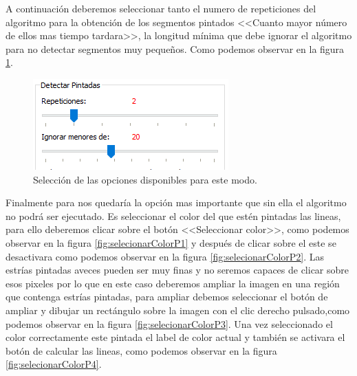 \documentclass[13pt]{book}              %
\begin{document}
{A continuación deberemos seleccionar tanto el numero de repeticiones del algoritmo para la obtención de los segmentos pintados <<Cuanto mayor número de ellos mas tiempo tardara>>, la longitud mínima que debe ignorar el algoritmo para no detectar segmentos muy pequeños. Como podemos observar en la figura \ref{fig:opcionesAlg}.

\begin{figure}[h]
\centering
\includegraphics[width=.55\textwidth]{opcionesAlg}
\caption{Selección de las opciones disponibles para este modo.}
\label{fig:opcionesAlg}
\end{figure}

Finalmente para nos quedaría la opción mas importante que sin ella el algoritmo no podrá ser ejecutado. Es seleccionar el color del que estén pintadas las lineas, para ello deberemos clicar sobre el botón <<Seleccionar color>>, como podemos observar en la figura \ref{fig:selecionarColorP1} y después de clicar sobre el este se desactivara como podemos observar en la figura \ref{fig:selecionarColorP2}.
Las estrías pintadas aveces pueden ser muy finas y no seremos capaces de clicar sobre esos pixeles por lo que en este caso deberemos ampliar la imagen en una región que contenga estrías pintadas, para ampliar debemos seleccionar el botón de ampliar y dibujar un rectángulo sobre la imagen con el clic derecho pulsado,como podemos observar en la figura \ref{fig:selecionarColorP3}.
Una vez seleccionado el color correctamente este pintada el label de color actual y también se activara el botón de calcular las lineas, como podemos observar en la figura \ref{fig:selecionarColorP4}.



}
\end{document}
